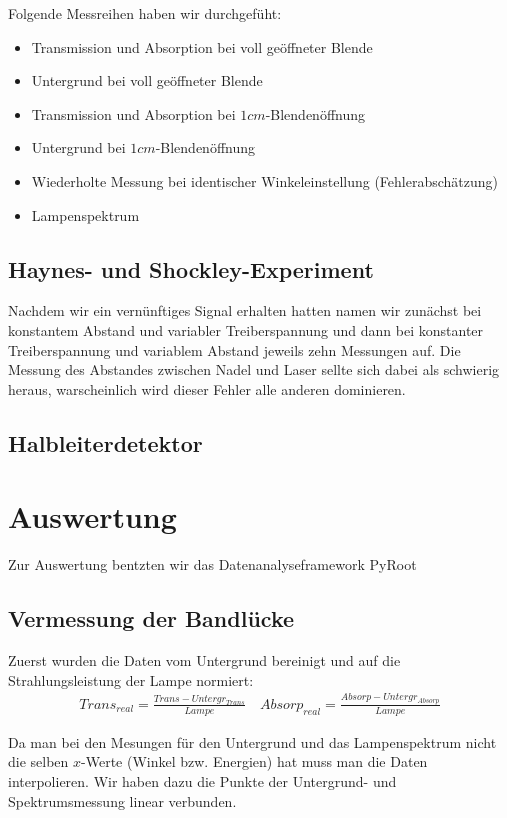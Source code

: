 \documentclass[12pt]{article}
\begin{document}
Folgende Messreihen haben wir durchgefüht:
\begin{itemize}
 \item Transmission und Absorption bei voll geöffneter Blende
 \item Untergrund bei voll geöffneter Blende
 \item Transmission und Absorption bei $1cm$-Blendenöffnung
 \item Untergrund bei $1cm$-Blendenöffnung
 \item Wiederholte Messung bei identischer Winkeleinstellung (Fehlerabschätzung)
 \item Lampenspektrum
\end{itemize}

\subsection{Haynes- und Shockley-Experiment}
Nachdem wir ein vernünftiges Signal erhalten hatten namen wir zunächst bei konstantem Abstand und variabler Treiberspannung und dann bei konstanter Treiberspannung und variablem Abstand jeweils zehn Messungen auf.
Die Messung des Abstandes zwischen Nadel und Laser sellte sich dabei als schwierig heraus, warscheinlich wird dieser Fehler alle anderen dominieren.

\subsection{Halbleiterdetektor}

\section{Auswertung}
Zur Auswertung bentzten wir das Datenanalyseframework PyRoot

\subsection{Vermessung der Bandlücke}
Zuerst wurden die Daten vom Untergrund bereinigt und auf die Strahlungsleistung der Lampe normiert:
\begin{align}
 Trans_{real} = \frac{Trans - Untergr_{Trans}}{Lampe} \quad Absorp_{real} = \frac{Absorp - Untergr_{Absorp}}{Lampe}
\end{align}

Da man bei den Mesungen für den Untergrund und das Lampenspektrum nicht die selben $x$-Werte (Winkel bzw. Energien) hat muss man die Daten interpolieren. Wir haben dazu die Punkte der Untergrund- und Spektrumsmessung linear verbunden.
\end{document}
